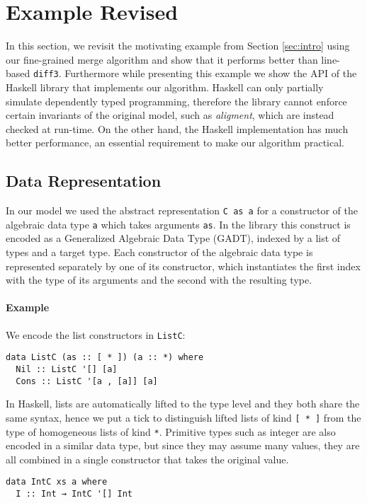 \documentclass{sigplanconf}
\theoremstyle{plain}
\begin{document}
\section{Example Revised}
\label{sec:haskell}
In this section, we revisit the motivating example from Section
\ref{sec:intro} using our fine-grained merge algorithm and show that
it performs better than line-based \texttt{diff3}.
%
Furthermore while presenting this example we show the API of the
Haskell library that implements our algorithm.
%
Haskell can only partially simulate dependently typed programming,
therefore the library cannot enforce certain invariants of the
original model, such as  \emph{aligment}, which are instead checked at
run-time.
%
On the other hand, the Haskell implementation has much better
performance, an essential requirement to make our algorithm practical.
%

\subsection{Data  Representation}
In our model we used the abstract representation \texttt{C as a}
for a constructor of the algebraic data type \texttt{a} which takes
arguments \texttt{as}.
%
In the library this construct is encoded as a Generalized Algebraic
Data Type (GADT), indexed by a list of types and a target type.
%
Each constructor of the algebraic data type is represented separately
by one of its constructor, which instantiates the first index with
the type of its arguments and the second with the resulting type.
%
\paragraph{Example}
We encode the list constructors in \texttt{ListC}:
\begin{verbatim}
data ListC (as :: [ * ]) (a :: *) where
  Nil :: ListC '[] [a]
  Cons :: ListC '[a , [a]] [a]
\end{verbatim}
In Haskell, lists are automatically lifted to the type level and they
both share the same syntax, hence we put a tick to distinguish lifted
lists of kind \texttt{[ * ]} from the type of homogeneous lists of kind \texttt{*}.
%
Primitive types such as integer are also encoded in a similar data
type, but since they may assume many values, they are all combined in
a single constructor that takes the original value.
\begin{verbatim}
data IntC xs a where
  I :: Int → IntC '[] Int
\end{verbatim}
\end{document}

